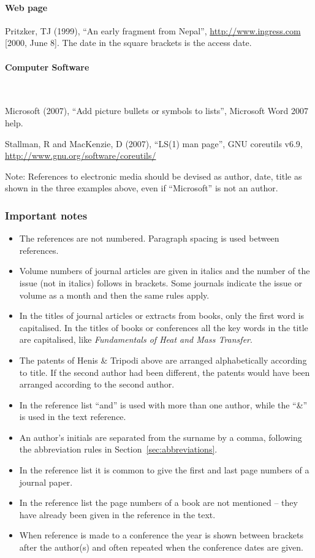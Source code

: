 \documentclass[a5paper, 10pt]{article}
\begin{document}
\paragraph{Web page}

Pritzker, TJ (1999), ``An early fragment from Nepal'',
  \url{http://www.ingress.com} [2000, June 8].  The date in the square brackets is the access date.

\paragraph{Computer Software}
\label{page:ref_compsoftware}
~

Microsoft (2007), ``Add picture bullets or symbols to lists'',
  Microsoft Word 2007 help.

Stallman, R and MacKenzie, D (2007), ``LS(1) man page'', GNU
  coreutils v6.9, \url{http://www.gnu.org/software/coreutils/}

Note: References to electronic media should be devised as author,
date, title as shown in the three examples above, even if
``Microsoft'' is not an author.

\subsubsection*{Important notes}

\begin{itemize}
\item The references are not numbered.  Paragraph spacing is used
  between references.
\item Volume numbers of journal articles are given in italics and the
  number of the issue (not in italics) follows in brackets.  Some
  journals indicate the issue or volume as a month and then the same
  rules apply.
\item In the titles of journal articles or extracts from books, only
  the first word is capitalised.  In the titles of books or
  conferences all the key words in the title are capitalised, like
  \textit{Fundamentals of Heat and Mass Transfer}.
\item The patents of Henis \& Tripodi above are arranged
  alphabetically according to title.  If the second author had been
  different, the patents would have been arranged according to the
  second author.
\item In the reference list ``and'' is used with more than one author,
  while the ``\&'' is used in the text reference.
\item An author's initials are separated from the surname by a comma,
  following the abbreviation rules in Section~\ref{sec:abbreviations}.
\item In the reference list it is common to give the first and last
  page numbers of a journal paper.
\item In the reference list the page numbers of a book are not
  mentioned -- they have already been given in the reference in the
  text.
\item When reference is made to a conference the year is shown between
  brackets after the author(s) and often repeated when the conference
  dates are given.
\end{itemize}
\end{document}
